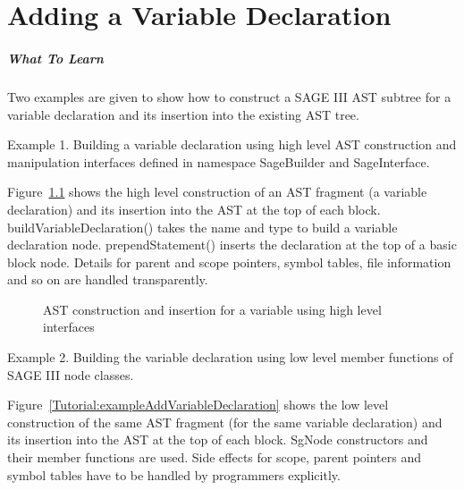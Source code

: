 \chapter{Adding a Variable Declaration}
\paragraph{What To Learn} Two examples are given to show how to construct a SAGE III 
AST subtree for a variable declaration and its insertion into the existing AST tree.

Example 1. Building a variable declaration using high level AST construction and 
manipulation interfaces defined in namespace SageBuilder and SageInterface. 

Figure~\ref{Tutorial:exampleAddVariableDeclaration2} shows the high level
construction of an AST fragment (a variable declaration) and its insertion 
into the AST at the top of each block. buildVariableDeclaration() takes the name and type
to build a variable declaration node. prependStatement() inserts the declaration at the top
of a basic block node. Details for parent and scope pointers, symbol tables, file information 
and so on are handled transparently.

\begin{figure}[!hbp]
{\indent
{\mySmallFontSize
\begin{latexonly}
   
\end{latexonly}

\begin{htmlonly}
   
\end{htmlonly}

}
}
\caption{AST construction and insertion for a variable using high level interfaces}
\label{Tutorial:exampleAddVariableDeclaration2}
\end{figure}


Example 2. Building the variable declaration using low level member functions of SAGE III node classes.

Figure~\ref{Tutorial:exampleAddVariableDeclaration} shows the low level
construction of the same AST fragment (for the same variable declaration) and its insertion 
into the AST at the top of each block. SgNode constructors and their member functions are used.
Side effects for scope, parent pointers and symbol tables have to be handled by programmers explicitly.

